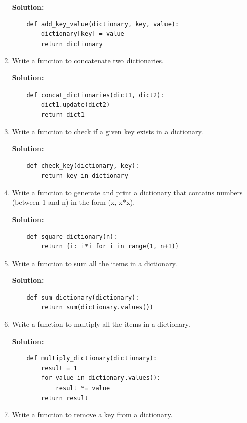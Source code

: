 \documentclass[12pt]{book}
\begin{document}
\begin{enumerate}
    \textbf{Solution:}
    \begin{lstlisting}
    def add_key_value(dictionary, key, value):
        dictionary[key] = value
        return dictionary
    \end{lstlisting}

    \item  Write a function to concatenate two dictionaries.

    \textbf{Solution:}
    \begin{lstlisting}
    def concat_dictionaries(dict1, dict2):
        dict1.update(dict2)
        return dict1
    \end{lstlisting}

    \item  Write a function to check if a given key exists in a dictionary.

    \textbf{Solution:}
    \begin{lstlisting}
    def check_key(dictionary, key):
        return key in dictionary
    \end{lstlisting}

    \item  Write a function to generate and print a dictionary that contains numbers (between 1 and n) in the form (x, x*x).

    \textbf{Solution:}
    \begin{lstlisting}
    def square_dictionary(n):
        return {i: i*i for i in range(1, n+1)}
    \end{lstlisting}

    \item  Write a function to sum all the items in a dictionary.

    \textbf{Solution:}
    \begin{lstlisting}
    def sum_dictionary(dictionary):
        return sum(dictionary.values())
    \end{lstlisting}

    \item  Write a function to multiply all the items in a dictionary.

    \textbf{Solution:}
    \begin{lstlisting}
    def multiply_dictionary(dictionary):
        result = 1
        for value in dictionary.values():
            result *= value
        return result
    \end{lstlisting}

    \item  Write a function to remove a key from a dictionary.


\end{enumerate}
\end{document}
